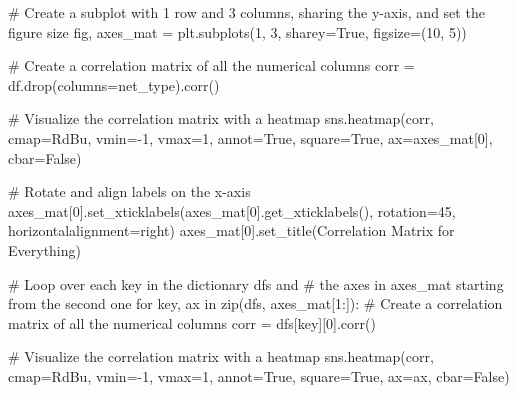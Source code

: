 \documentclass[
  letterpaper,
  DIV=11,
  numbers=noendperiod,
  oneside]{scrartcl}
\newenvironment{Shaded}{\begin{snugshade}}{\end{snugshade}}
\newcommand{\BuiltInTok}[1]{\textcolor[rgb]{0.00,0.23,0.31}{#1}}
\newcommand{\CommentTok}[1]{\textcolor[rgb]{0.37,0.37,0.37}{#1}}
\newcommand{\ControlFlowTok}[1]{\textcolor[rgb]{0.00,0.23,0.31}{#1}}
\newcommand{\DecValTok}[1]{\textcolor[rgb]{0.68,0.00,0.00}{#1}}
\newcommand{\KeywordTok}[1]{\textcolor[rgb]{0.00,0.23,0.31}{#1}}
\newcommand{\NormalTok}[1]{\textcolor[rgb]{0.00,0.23,0.31}{#1}}
\newcommand{\OperatorTok}[1]{\textcolor[rgb]{0.37,0.37,0.37}{#1}}
\newcommand{\StringTok}[1]{\textcolor[rgb]{0.13,0.47,0.30}{#1}}
\newcommand{\VariableTok}[1]{\textcolor[rgb]{0.07,0.07,0.07}{#1}}
\begin{document}
\begin{Shaded}
\begin{Highlighting}[]
\CommentTok{\# Create a subplot with 1 row and 3 columns, sharing the y{-}axis, and set the figure size}
\NormalTok{fig, axes\_mat }\OperatorTok{=}\NormalTok{ plt.subplots(}\DecValTok{1}\NormalTok{, }\DecValTok{3}\NormalTok{, sharey}\OperatorTok{=}\VariableTok{True}\NormalTok{, figsize}\OperatorTok{=}\NormalTok{(}\DecValTok{10}\NormalTok{, }\DecValTok{5}\NormalTok{))}

\CommentTok{\# Create a correlation matrix of all the numerical columns}
\NormalTok{corr }\OperatorTok{=}\NormalTok{ df.drop(columns}\OperatorTok{=}\StringTok{\textquotesingle{}net\_type\textquotesingle{}}\NormalTok{).corr()}

\CommentTok{\# Visualize the correlation matrix with a heatmap}
\NormalTok{sns.heatmap(corr, cmap}\OperatorTok{=}\StringTok{\textquotesingle{}RdBu\textquotesingle{}}\NormalTok{, vmin}\OperatorTok{={-}}\DecValTok{1}\NormalTok{, vmax}\OperatorTok{=}\DecValTok{1}\NormalTok{, annot}\OperatorTok{=}\VariableTok{True}\NormalTok{, square}\OperatorTok{=}\VariableTok{True}\NormalTok{, ax}\OperatorTok{=}\NormalTok{axes\_mat[}\DecValTok{0}\NormalTok{], cbar}\OperatorTok{=}\VariableTok{False}\NormalTok{)}

\CommentTok{\# Rotate and align labels on the x{-}axis}
\NormalTok{axes\_mat[}\DecValTok{0}\NormalTok{].set\_xticklabels(axes\_mat[}\DecValTok{0}\NormalTok{].get\_xticklabels(), rotation}\OperatorTok{=}\DecValTok{45}\NormalTok{, horizontalalignment}\OperatorTok{=}\StringTok{\textquotesingle{}right\textquotesingle{}}\NormalTok{)}
\NormalTok{axes\_mat[}\DecValTok{0}\NormalTok{].set\_title(}\StringTok{\textquotesingle{}Correlation Matrix for Everything\textquotesingle{}}\NormalTok{)}

\CommentTok{\# Loop over each key in the dictionary \textquotesingle{}dfs\textquotesingle{} and }
\CommentTok{\# the axes in \textquotesingle{}axes\_mat\textquotesingle{} starting from the second one}
\ControlFlowTok{for}\NormalTok{ key, ax }\KeywordTok{in} \BuiltInTok{zip}\NormalTok{(dfs, axes\_mat[}\DecValTok{1}\NormalTok{:]):}
    \CommentTok{\# Create a correlation matrix of all the numerical columns}
\NormalTok{    corr }\OperatorTok{=}\NormalTok{ dfs[key][}\DecValTok{0}\NormalTok{].corr()}

    \CommentTok{\# Visualize the correlation matrix with a heatmap}
\NormalTok{    sns.heatmap(corr, cmap}\OperatorTok{=}\StringTok{\textquotesingle{}RdBu\textquotesingle{}}\NormalTok{, vmin}\OperatorTok{={-}}\DecValTok{1}\NormalTok{, vmax}\OperatorTok{=}\DecValTok{1}\NormalTok{, annot}\OperatorTok{=}\VariableTok{True}\NormalTok{, square}\OperatorTok{=}\VariableTok{True}\NormalTok{, ax}\OperatorTok{=}\NormalTok{ax, cbar}\OperatorTok{=}\VariableTok{False}\NormalTok{)}


\end{Highlighting}
\end{Shaded}
\end{document}
